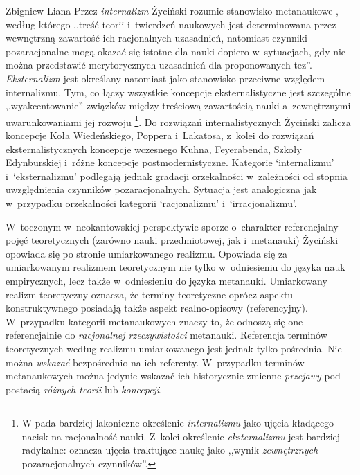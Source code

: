 \begin{artplenv}{Zbigniew Liana}
Przez \textit{internalizm} Życiński rozumie stanowisko metanaukowe
\parencite*[s.~134]{zycinski_elementy_1996},
według którego ,,treść teorii i~twierdzeń naukowych jest determinowana przez wewnętrzną zawartość ich racjonalnych
uzasadnień, natomiast czynniki pozaracjonalne mogą okazać się istotne dla nauki dopiero w~sytuacjach, gdy nie można
przedstawić merytorycznych uzasadnień dla proponowanych tez''.  \textit{Eksternalizm} jest określany natomiast jako
stanowisko przeciwne względem internalizmu. Tym, co łączy wszystkie koncepcje eksternalistyczne jest szczególne
,,wyakcentowanie'' związków między treściową zawartością nauki a~zewnętrznymi uwarunkowaniami jej rozwoju
\parencite[s.~134]{zycinski_elementy_1996} \footnote{W
\parencite[s.~242]{zycinski_granice_1993}
pada bardziej lakoniczne określenie \textit{internalizmu} jako
ujęcia kładącego nacisk na racjonalność nauki. Z~kolei określenie \textit{eksternalizmu} jest bardziej radykalne: oznacza
ujęcia traktujące naukę jako ,,wynik \textit{zewnętrznych} pozaracjonalnych czynników''.}. Do rozwiązań internalistycznych
Życiński zalicza koncepcje Koła Wiedeńskiego, Poppera i~Lakatosa, z~kolei do rozwiązań eksternalistycznych koncepcje
wczesnego Kuhna, Feyerabenda, Szkoły Edynburskiej i~różne koncepcje postmodernistyczne. Kategorie
`internalizmu' i~`eksternalizmu' podlegają jednak gradacji orzekalności w~zależności od stopnia uwzględnienia czynników
pozaracjonalnych. Sytuacja jest analogiczna jak w~przypadku orzekalności kategorii `racjonalizmu' i~`irracjonalizmu'.

\begin{uwaga}
W~toczonym w~neokantowskiej perspektywie sporze o~charakter referencjalny pojęć teoretycznych (zarówno
nauki przedmiotowej, jak i~metanauki) Życiński opowiada się po stronie umiarkowanego realizmu. Opowiada się za
umiarkowanym realizmem teoretycznym nie tylko w~odniesieniu do języka nauk empirycznych, lecz także w~odniesieniu do
języka metanauki. Umiarkowany realizm teoretyczny oznacza, że terminy teoretyczne oprócz aspektu konstruktywnego
posiadają także aspekt realno-opisowy (referencyjny). W~przypadku kategorii metanaukowych znaczy to, że odnoszą się one
referencjalnie do \textit{racjonalnej rzeczywistości} metanauki. Referencja terminów teoretycznych według realizmu
umiarkowanego jest jednak tylko pośrednia. Nie można \textit{wskazać }bezpośrednio na ich referenty. W~przypadku terminów
metanaukowych można jedynie wskazać ich historycznie zmienne \textit{przejawy} pod postacią \textit{różnych teorii}
lub \textit{koncepcji}.
\end{uwaga}


\end{artplenv}
